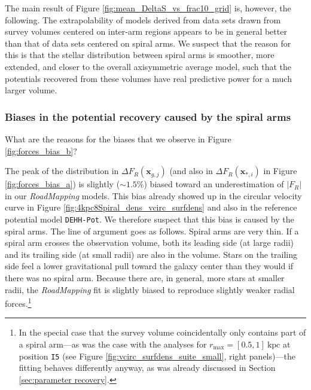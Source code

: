 \documentclass[iop,revtex4,numberedappendix,appendixfloats]{emulateapj}
\newcommand{\vect}[1]{\boldsymbol{#1}}
\newcommand{\RM}{{\sl RoadMapping}}
\begin{document}
The main result of Figure \ref{fig:mean_DeltaS_vs_frac10_grid} is, however, the following. The extrapolability of models derived from data sets drawn from survey volumes centered on inter-arm regions appears to be in general better than that of data sets centered on spiral arms. We suspect that the reason for this is that the stellar distribution between spiral arms is smoother, more extended, and closer to the overall axisymmetric average model, such that the potentials recovered from these volumes have real predictive power for a much larger volume.

\subsubsection{Biases in the potential recovery caused by the spiral arms} \label{sec:biases_explained}

What are the reasons for the biases that we observe in Figure \ref{fig:forces_bias_b}? 

The peak of the distribution in $\Delta F_R(\vect{x}_{g,j})$ (and also in $\Delta F_R(\vect{x}_{*,i})$ in Figure \ref{fig:forces_bias_a}) is slightly ($\sim1.5\%$) biased toward an underestimation of $|F_{R}|$ in our \RM{} models. This bias already showed up in the circular velocity curve in Figure \ref{fig:4kpc8Spiral_dens_vcirc_surfdens} and also in the reference potential model \texttt{DEHH-Pot}. We therefore suspect that this bias is caused by the spiral arms. The line of argument goes as follows. Spiral arms are very thin. If a spiral arm crosses the observation volume, both its leading side (at large radii) and its trailing side (at small radii) are also in the volume. Stars on the trailing side feel a lower gravitational pull toward the galaxy center than they would if there was no spiral arm. Because there are, in general, more stars at smaller radii, the \RM{} fit is slightly biased to reproduce slightly weaker radial forces.\footnote{In the special case that the survey volume coincidentally only contains part of a spiral arm---as was the case with the analyses for $r_\text{max}=[0.5,1]~\text{kpc}$ at position \texttt{I5} (see Figure \ref{fig:vcirc_surfdens_suite_small}, right panels)---the fitting behaves differently anyway, as was already discussed in Section \ref{sec:parameter recovery}.}
\end{document}
